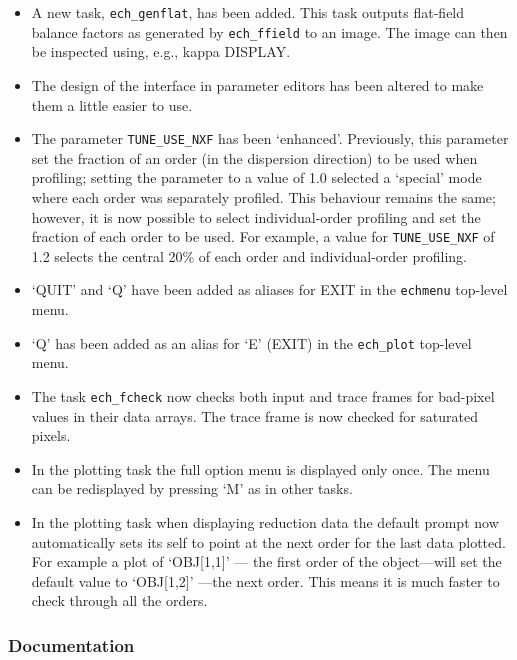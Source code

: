\documentclass[11pt,twoside]{article}
\newcommand{\htmlref}[2]{#1}
\newcommand{\xref}[3]{#1}
\begin{document}
\begin{itemize}
 \item A new task, \htmlref{{\tt{ech\_genflat}}}{ech_genflat},
   has been added.  This task outputs flat-field
   balance factors as generated by \htmlref{{\tt{ech\_ffield}}}{ech_ffield}
   to an image.  The image
   can then be inspected using, e.g., \xref{{\sc kappa}}{sun95}{}
   \xref{DISPLAY}{sun95}{DISPLAY}.
\item The design of the interface in parameter editors has been altered
   to make them a little easier to use.
\item The parameter \htmlref{{\tt{TUNE\_USE\_NXF}}}{par_TUNE_USE_NXF}
   has been `enhanced'.  Previously, this
   parameter set the fraction of an order (in the dispersion direction)
   to be used when profiling; setting the parameter to a value of 1.0
   selected a `special' mode where each order was separately profiled.
   This behaviour remains the same; however, it is now possible to
   select individual-order profiling and set the fraction of each order
   to be used.  For example, a value for {\tt TUNE\_USE\_NXF} of 1.2 selects
   the central 20\% of each order and individual-order profiling.
\item `QUIT' and `Q' have been added as aliases for EXIT in the \texttt{echmenu}
   top-level menu.
\item `Q' has been added as an alias for `E' (EXIT) in the
   \htmlref{{\tt{ech\_plot}}}{ech_plot} top-level menu.
\item The task \htmlref{{\tt{ech\_fcheck}}}{ech_fcheck} now checks both
   input and trace frames for
   bad-pixel values in their data arrays.  The trace frame is now
   checked for saturated pixels.
\item In the plotting task the full option menu is displayed only once.
   The menu can be redisplayed by pressing `M' as in other tasks.
\item In the plotting task when displaying reduction data the default
   prompt now automatically sets its self to point at the next order
   for the last data plotted.  For example a plot of `OBJ[1,1]' --- the
   first order of the object---will set the default value to `OBJ[1,2]'
   ---the next order.  This means it is much faster to check through all
   the orders.
\end{itemize}

\subsubsection{Documentation}
\end{document}
